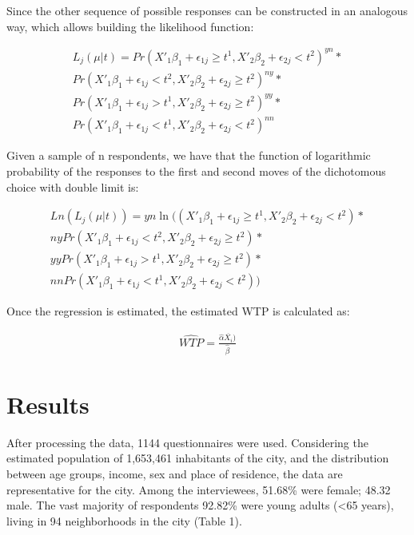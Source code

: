 \documentclass[smallextended]{svjour3}       %
\begin{document}
Since the other sequence of possible responses can be constructed in an
analogous way, which allows building the likelihood function:

\[
\begin{aligned}
L_{j} (\mu | t) = Pr(X'_{1}\beta_{1} + \epsilon_{1j} \ge t^1, X'_{2}\beta_{2} + \epsilon_{2j} < t^2)^{yn} * \\
Pr(X'_{1}\beta_{1} + \epsilon_{1j} < t^2 , X'_{2}\beta_{2} + \epsilon_{2j} \ge t^2)^{ny} * \\
Pr(X'_{1}\beta_{1} + \epsilon_{1j} > t^1, X'_{2}\beta_{2} + \epsilon_{2j} \ge t^2)^{yy} * \\ 
Pr(X'_{1}\beta_{1} + \epsilon_{1j} < t^1, X'_{2}\beta_{2} + \epsilon_{2j} < t^2)^{nn} 
\end{aligned}
\]

Given a sample of n respondents, we have that the function of
logarithmic probability of the responses to the first and second moves
of the dichotomous choice with double limit is:

\[
\begin{aligned}
Ln(L_{j} (\mu | t)) = yn \ln((X'_{1}\beta_{1} + \epsilon_{1j} \ge t^1, X'_{2}\beta_{2} + \epsilon_{2j} < t^2) * \\
ny Pr(X'_{1}\beta_{1} + \epsilon_{1j} < t^2 , X'_{2}\beta_{2} + \epsilon_{2j} \ge t^2) * \\
yy Pr(X'_{1}\beta_{1} + \epsilon_{1j} > t^1, X'_{2}\beta_{2} + \epsilon_{2j} \ge t^2) * \\
nn Pr(X'_{1}\beta_{1} + \epsilon_{1j} < t^1, X'_{2}\beta_{2} + \epsilon_{2j} < t^2)) 
\end{aligned}
\]

Once the regression is estimated, the estimated WTP is calculated as:

\begin{align}
\widehat{WTP} = \frac{\hat{\alpha}\overline{X_{i}})}{\hat{\beta}} 
\end{align}

\hypertarget{sec:3}{%
\section{Results}\label{sec:3}}

After processing the data, 1144 questionnaires were used. Considering
the estimated population of 1,653,461 inhabitants of the city, and the
distribution between age groups, income, sex and place of residence, the
data are representative for the city. Among the interviewees, 51.68\%
were female; 48.32 male. The vast majority of respondents 92.82\% were
young adults (\textless65 years), living in 94 neighborhoods in the city
(Table 1).
\end{document}
